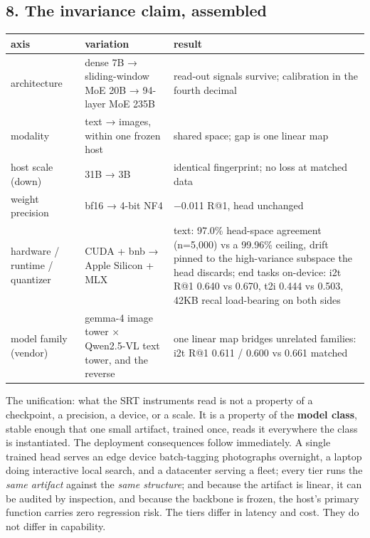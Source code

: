 \documentclass[
  11pt,
]{article}
\newcounter{none} %
\begin{document}
\subsection{8. The invariance claim,
assembled}\label{the-invariance-claim-assembled}

{\def\LTcaptype{none} %
\begin{longtable}[]{@{}
  >{\raggedright\arraybackslash}p{}
  >{\raggedright\arraybackslash}p{}
  >{\raggedright\arraybackslash}p{}@{}}
\toprule\noalign{}
\begin{minipage}[b]{\linewidth}\raggedright
axis
\end{minipage} & \begin{minipage}[b]{\linewidth}\raggedright
variation
\end{minipage} & \begin{minipage}[b]{\linewidth}\raggedright
result
\end{minipage} \\
\midrule\noalign{}
\endhead
\bottomrule\noalign{}
\endlastfoot
architecture & dense 7B → sliding-window MoE 20B → 94-layer MoE 235B &
read-out signals survive; calibration in the fourth decimal \\
modality & text → images, within one frozen host & shared space; gap is
one linear map \\
host scale (down) & 31B → 3B & identical fingerprint; no loss at matched
data \\
weight precision & bf16 → 4-bit NF4 & −0.011 R@1, head unchanged \\
hardware / runtime / quantizer & CUDA + bnb → Apple Silicon + MLX &
text: 97.0\% head-space agreement (n=5,000) vs a 99.96\% ceiling, drift
pinned to the high-variance subspace the head discards; end tasks
on-device: i2t R@1 0.640 vs 0.670, t2i 0.444 vs 0.503, 42KB recal
load-bearing on both sides \\
model family (vendor) & gemma-4 image tower × Qwen2.5-VL text tower, and
the reverse & one linear map bridges unrelated families: i2t R@1 0.611 /
0.600 vs 0.661 matched \\
\end{longtable}
}

The unification: what the SRT instruments read is not a property of a
checkpoint, a precision, a device, or a scale. It is a property of the
\textbf{model class}, stable enough that one small artifact, trained
once, reads it everywhere the class is instantiated. The deployment
consequences follow immediately. A single trained head serves an edge
device batch-tagging photographs overnight, a laptop doing interactive
local search, and a datacenter serving a fleet; every tier runs the
\emph{same artifact} against the \emph{same structure}; and because the
artifact is linear, it can be audited by inspection, and because the
backbone is frozen, the host's primary function carries zero regression
risk. The tiers differ in latency and cost. They do not differ in
capability.
\end{document}
